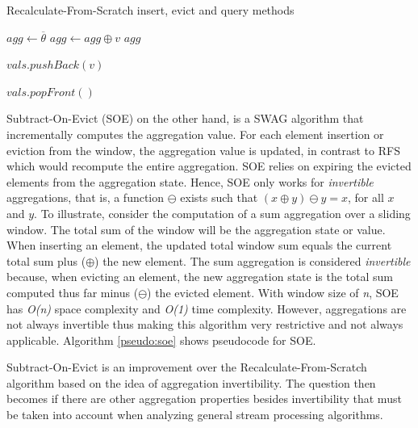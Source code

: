 \begin{algorithm}
    \caption{Recalculate-From-Scratch insert, evict and query methods}
    \label{pseudo:rfs}
    \begin{algorithmic}[1]
            \State $agg\gets\overline{\theta}$
                \State $agg \gets agg \oplus v$
            \EndFor
            \State \Return $agg$
        \EndFunction
        
        
        
            \State $vals.pushBack(v)$
        \EndFunction
        
        
        
            \State $vals.popFront()$
        \EndFunction
    \end{algorithmic}
\end{algorithm}

Subtract-On-Evict (SOE) on the other hand, is a SWAG algorithm that incrementally computes the aggregation value. For each element insertion or eviction from the window, the aggregation value is updated, in contrast to RFS which would recompute the entire aggregation. SOE relies on expiring the evicted elements from the aggregation state. Hence, SOE only works for \textit{invertible} aggregations, that is, a function $\ominus$ exists such that $(x \oplus y) \ominus y = x$, for all $x$ and $y$. To illustrate, consider the computation of a sum aggregation over a sliding window. The total sum of the window will be the aggregation state or value. When inserting an element, the updated total window sum equals the current total sum plus ($\oplus$) the new element. The sum aggregation is considered \textit{invertible} because, when evicting an element, the new aggregation state is the total sum computed thus far minus ($\ominus$) the evicted element. With window size of \textit{n}, SOE has \textit{O(n)} space complexity and \textit{O(1)} time complexity. However, aggregations are not always invertible thus making this algorithm very restrictive and not always applicable. Algorithm \ref{pseudo:soe} shows pseudocode for SOE.

Subtract-On-Evict is an improvement over the Recalculate-From-Scratch algorithm based on the idea of aggregation invertibility. The question then becomes if there are other aggregation properties besides invertibility that must be taken into account when analyzing general stream processing algorithms.

